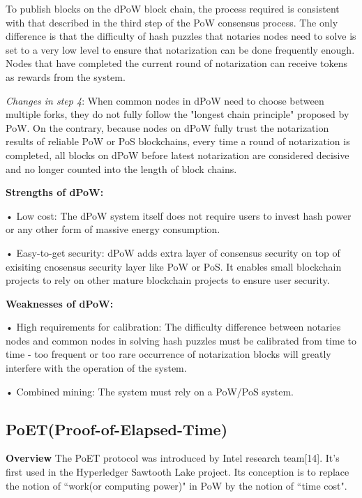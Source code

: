 \documentclass[doublespacing]{bmcart}
\begin{document}
\begin{CJK*}{UTF8}{gbsn}
To publish blocks on the dPoW block chain, the process required is consistent with that described in the third step of the PoW consensus process. The only difference is that the difficulty of hash puzzles that notaries nodes need to solve is set to a very low level to ensure that notarization can be done frequently enough. Nodes that have completed the current round of notarization can receive tokens as rewards from the system.
    \par\textsl{Changes in step 4}: When common nodes in dPoW need to choose between multiple forks, they do not fully follow the "longest chain principle" proposed by PoW. On the contrary, because nodes on dPoW fully trust the notarization results of reliable PoW or PoS blockchains, every time a round of notarization is completed, all blocks on dPoW before latest notarization are considered decisive and no longer counted into the length of block chains.
	\par\textbf{Strengths of dPoW:}		
    \par• Low cost: The dPoW system itself does not require users to invest hash power or any other form of massive energy consumption. 
    \par• Easy-to-get security: dPoW adds extra layer of consensus security on top of exisiting cnosensus security layer like PoW or PoS. It enables small blockchain projects to rely on other mature blockchain projects to ensure user security.
	\par\textbf{Weaknesses of dPoW:}	
    \par • High requirements for calibration: The difficulty difference between notaries nodes and common nodes in solving hash puzzles must be calibrated from time to time - too frequent or too rare occurrence of notarization blocks will greatly interfere with the operation of the system.
    \par • Combined mining: The system must rely on a PoW/PoS system.
    
    \subsection{\textbf{PoET(Proof-of-Elapsed-Time)}} 
	\textbf{Overview}
The PoET protocol was introduced by Intel research team[14]. It’s first used in the Hyperledger Sawtooth Lake project. Its conception is to replace the notion of ``work(or computing power)" in PoW by the notion of ``time cost".


\end{CJK*}
\end{document}
